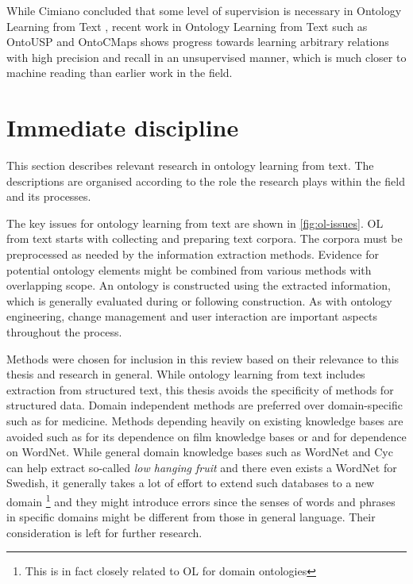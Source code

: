 \documentclass[a4paper]{report}
\begin{document}
While Cimiano concluded that some level of supervision is necessary in Ontology Learning from Text \citep{Cimiano06}, recent work in Ontology Learning from Text such as OntoUSP\citep{Poon2010OntoUSP} and OntoCMaps \citep{Zouaq11OntoCmaps} shows progress towards learning arbitrary relations with high precision and recall in an unsupervised manner, which is much closer to machine reading than earlier work in the field.


\section{Immediate discipline}
\label{sec:lit-rev:immediate}

This section describes relevant research in ontology learning from text.
The descriptions are organised according to the role the research plays within the field and its processes.

The key issues for ontology learning from text are shown in \ref{fig:ol-issues}.
OL from text starts with collecting and preparing text corpora. The corpora must be preprocessed as needed by the information extraction methods. Evidence for potential ontology elements might be combined from various methods with overlapping scope. An ontology is constructed using the extracted information, which is generally evaluated during or following construction. As with ontology engineering, change management and user interaction are important aspects throughout the process.

Methods were chosen for inclusion in this review based on their relevance to this thesis and research in general.
While ontology learning from text includes extraction from structured text, this thesis avoids the specificity of methods for structured data.
Domain independent methods are preferred over domain-specific such as \cite{LeeEtAl03OLMed} for medicine.
Methods depending heavily on existing knowledge bases are avoided such as \cite{Gulla08LOUIE} for its dependence on film knowledge bases or \cite{Drumond10PREHE} and \cite{HaiTaoEtAl08Clonto} for dependence on WordNet\cite{Fellbaum98WordNet}.
While general domain knowledge bases such as WordNet and Cyc\cite{Lenat95Cyc} can help extract so-called \emph{low hanging fruit} and there even exists a WordNet for Swedish\cite{Viberg02SWordNet}, it generally takes a lot of effort to extend such databases to a new domain \footnote{This is in fact closely related to OL for domain ontologies} and they might introduce errors since the senses of words and phrases in specific domains might be different from those in general language.
Their consideration is left for further research.
\end{document}
